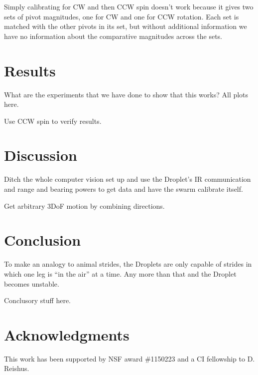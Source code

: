 \documentclass[letterpaper, 10pt, conference]{ieeeconf}
\begin{document}
Simply calibrating for CW and then CCW spin doesn't work because it gives two sets of pivot magnitudes, one for CW and one for CCW rotation. Each set is matched with the other pivots in its set, but without additional information we have no information about the comparative magnitudes across the sets.




\section{Results}

What are the experiments that we have done to show that this works? All plots here.

Use CCW spin to verify results.




\section{Discussion}
Ditch the whole computer vision set up and use the Droplet's IR communication and range and bearing powers to get data and have the swarm calibrate itself.

Get arbitrary 3DoF motion by combining directions.

\section{Conclusion}
To make an analogy to animal strides, the Droplets are only capable of strides in which one leg is ``in the air'' at a time. Any more than that and the Droplet becomes unstable.

Conclusory stuff here.

\section*{Acknowledgments}
This work has been supported by NSF award \#1150223 and a CI fellowship to D. Reishus.




\end{document}
